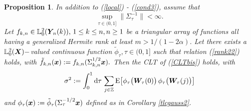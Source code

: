 \documentclass[10pt]{article}
\def\L{\mathbb{L}}
\def\R{\mathbb{R}}
\def\Z{\mathbb{Z}}
\def\d{\mathrm d}
\def\E{\mathrm E}
\newcommand{\mbf}[1]{\mbox{\boldmath $#1$}}
\newtheorem{prop}{Proposition}
\begin{document}
\begin{prop} \label{localCLT} In addition to (\ref{local}) - (\ref{cond3}), assume that
\begin{equation} \label{bddS1}
\sup_{\tau \in (0,1]} \| \Sigma^{-1}_\tau \| < \infty.
\end{equation}
Let $f_{k,n} \in  \L^2_0({\mbf Y}_{\!n}(k)), \,  1 \le k \le  n,  n \ge 1$
be a triangular array of functions all having a generalized Hermite rank at least $m > 1/(1-2\alpha) $. Let there exists a $ \L^2_0({\mbf X})-$valued
continuous function $\tilde \phi_\tau, \tau \in (0,1]$ such that relation (\ref{rank22}) holds, with
$\tilde f_{k,n}({\mbf x}) :=f_{k,n}( \Sigma^{1/2}_{k,n} {\mbf x}). $
Then the CLT of (\ref{CLTbis}) holds, with
\begin{eqnarray}\label{sigmaloc}
\sigma^2 :=\int_0^1 \d \tau \, \sum_{j\in \Z} \E \big [ \phi_\tau\big ({\mbf W}_{\!\tau}(0)\big)\, \phi_\tau\big({\mbf W}_{\!\tau}(j) \big)\big ]
\end{eqnarray}
and   $\phi_\tau ({\mbf x}) := \tilde \phi_\tau (\Sigma^{-1/2}_\tau {\mbf x})$
defined as in Corollary \ref{tlcgauss2}.


\end{prop}
\end{document}
